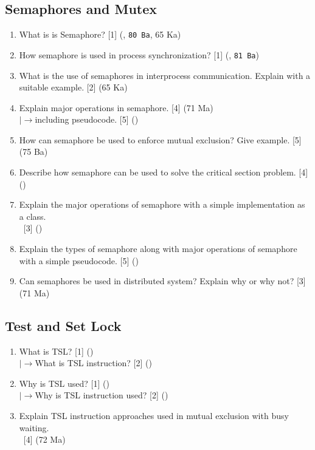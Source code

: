 \documentclass[12pt]{article}
\newcommand{\lb}{\\$\left|\rightarrow\right.$}
\newcommand{\enter}{\\\textcolor{white}{1}}
\begin{document}
	\subsection{Semaphores and Mutex}
		\begin{enumerate}[noitemsep, topsep=0pt]			
			\item What is is Semaphore? \hfill [1] (, \texttt{80 Ba}, 65 Ka)

			\item How semaphore is used in process synchronization? \hfill [1] (, \texttt{81 Ba})
			
			\item What is the use of semaphores in interprocess communication. Explain with a suitable example. \hfill [2] (65 Ka)
			
			\item Explain major operations in semaphore. \hfill [4] (71 Ma)
			\lb including pseudocode. \hfill [5] ()
			
			\item How can semaphore be used to enforce mutual exclusion? Give example. \hfill [5] (75 Ba)
			
			\item Describe how semaphore can be used to solve the critical section problem. \hfill [4] ()
			
			\item Explain the major operations of semaphore with a simple implementation as a class.
			\enter\hfill [3] ()
			
			\item Explain the types of semaphore along with major operations of semaphore with a simple pseudocode. \hfill [5] ()
			
			\item Can semaphores be used in distributed system? Explain why or why not? \hfill [3] (71 Ma)
		\end{enumerate}
		
	\subsection{Test and Set Lock}
		\begin{enumerate}[noitemsep, topsep=0pt]
			\item What is TSL? \hfill [1] ()
			\lb What is TSL instruction? \hfill [2] ()
			
			\item Why is TSL used? \hfill [1] ()
			\lb Why is TSL instruction used? \hfill [2] ()
			
			\item Explain TSL instruction approaches used in mutual exclusion with busy waiting.
			\enter\hfill [4] (72 Ma)
		\end{enumerate}
		
\end{document}
